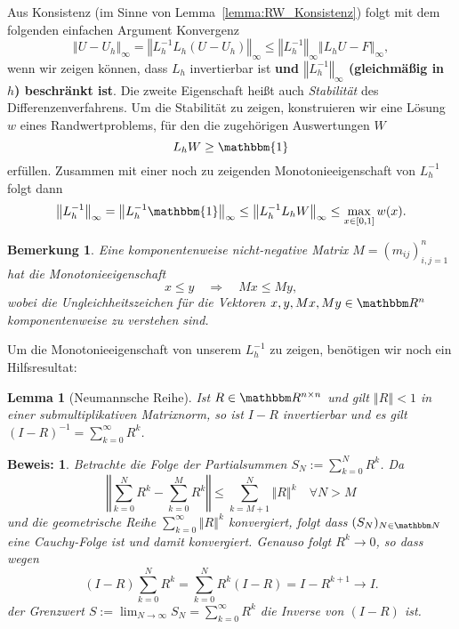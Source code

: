 \documentclass[12pt,a4paper]{book}
\theoremstyle{break}
\newtheorem{bemerkung}[theorem]{Bemerkung}
\newtheorem{lemma}[theorem]{Lemma}
\theoremstyle{nonumberplain}
\newtheorem{beweis}{Beweis:}
\newcommand{\N}{\mathbbm N}
\newcommand{\R}{\mathbbm R}
\newcommand{\norm}[1]{\left\Vert#1\right\Vert}		%
\newcommand{\1}{\mathbbm{1}} 			      	%
\begin{document}
Aus Konsistenz (im Sinne von Lemma~\ref{lemma:RW_Konsistenz}) folgt mit 
dem folgenden einfachen Argument Konvergenz
\[
\norm{U-U_h}_\infty = \norm{L_h^{-1} L_h (U-U_h)}_\infty\leq \norm{L_h^{-1}}_\infty \norm{L_h U-F}_\infty,
\]
wenn wir zeigen können, dass $L_h$ invertierbar ist {\bf und $\norm{L_h^{-1}}_\infty$ (gleichmäßig in $h$) beschränkt ist}. Die zweite Eigenschaft heißt auch \emph{Stabilität} des Differenzenverfahrens. Um die Stabilität zu zeigen, 
konstruieren wir eine Lösung $w$ eines Randwertproblems, für den die zugehörigen Auswertungen $W$ 
\[
L_h W\geq \1
\]
erfüllen. Zusammen mit einer noch zu zeigenden Monotonieeigenschaft von $L_h^{-1}$ folgt
dann
\[
\norm{L_h^{-1}}_\infty = \norm{L_h^{-1} \1}_\infty \leq \norm{L_h^{-1} L_h W}_\infty\leq \max_{x\in [0,1]} w(x).
\]



\begin{bemerkung}\label{bem:monotonie}
Eine komponentenweise nicht-negative Matrix $M=(m_{ij})_{i,j=1}^n$ hat die Monotonieeigenschaft
\[
x\leq y \quad \Longrightarrow \quad Mx\leq My, 
\]
wobei die Ungleichheitszeichen für die Vektoren $x,y,Mx,My\in \R^n$ komponentenweise zu verstehen sind.
\end{bemerkung}


Um die Monotonieeigenschaft von unserem $L_h^{-1}$ zu zeigen, benötigen 
wir noch ein Hilfsresultat:

\begin{lemma}[Neumannsche Reihe]\label{lemma:NR}
Ist $R\in \R^{n\times n}$ und gilt $\norm{R}<1$ in einer submultiplikativen Matrixnorm,
so ist $I-R$ invertierbar und es gilt $(I-R)^{-1}=\sum_{k=0}^\infty R^k$.
\end{lemma}
\begin{beweis}
Betrachte die Folge der Partialsummen $S_N:=\sum_{k=0}^N R^k$. Da
\[
\norm{\sum_{k=0}^N R^k - \sum_{k=0}^M R^k}\leq \sum_{k=M+1}^N \norm{R}^k \quad \forall N>M
\]
und die geometrische Reihe $\sum_{k=0}^\infty \norm{R}^k$ konvergiert, folgt dass
$(S_N)_{N\in \N}$ eine Cauchy-Folge ist und damit konvergiert. 
Genauso folgt $R^k\to 0$, so dass wegen
\[
(I-R) \sum_{k=0}^N R^k= \sum_{k=0}^N R^k (I-R) = I- R^{k+1}\to I.
\]
der Grenzwert $S:=\lim_{N\to \infty}S_N=\sum_{k=0}^\infty R^k$  die Inverse von $(I-R)$ ist.
\end{beweis}
\end{document}
